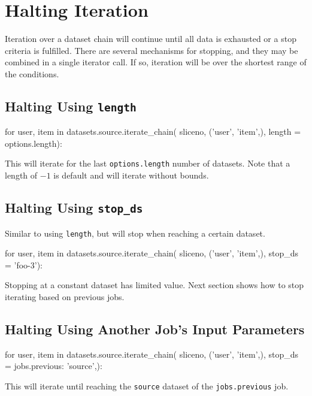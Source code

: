 \section{Halting Iteration}

Iteration over a dataset chain will continue until all data is
exhausted or a stop criteria is fulfilled.  There are several
mechanisms for stopping, and they may be combined in a single iterator
call.  If so, iteration will be over the shortest range of the
conditions.

\subsection{Halting Using \texttt{length}}
\begin{python}
for user, item in datasets.source.iterate_chain(
                       sliceno, ('user', 'item',),
                       length = options.length):
\end{python}
This will iterate for the last \texttt{options.length} number of
datasets.  Note that a length of $-1$ is default and will iterate
without bounds.


\subsection{Halting Using \texttt{stop\_ds}}
Similar to using \texttt{length}, but will stop when reaching a
certain dataset.
\begin{python}
for user, item in datasets.source.iterate_chain(
                       sliceno, ('user', 'item',),
                       stop_ds = 'foo-3'):
\end{python}
Stopping at a constant dataset has limited value.  Next section shows
how to stop iterating based on previous jobs.



\subsection{Halting Using Another Job's Input Parameters}
\begin{python}
for user, item in datasets.source.iterate_chain(
                       sliceno, ('user', 'item',),
                       stop_ds = {jobs.previous: 'source',}):
\end{python}
This will iterate until reaching the \texttt{source} dataset of
the \texttt{jobs.previous} job.




